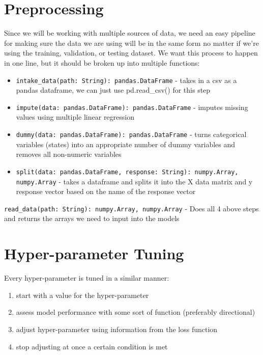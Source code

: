 \documentclass{article}
\begin{document}
	\section{Preprocessing}
	Since we will be working with multiple sources of data, we need an easy pipeline for making sure the data we are using 
	will be in the same form no matter if we're using the training, validation, or testing dataset. We want this process to 
	happen in one line, but it should be broken up into multiple functions: 
	
	\begin{itemize}
		\item \verb|intake_data(path: String): pandas.DataFrame| - takes in a csv as a pandas dataframe, we can just use pd.read\_csv() for this step
		\item \verb|impute(data: pandas.DataFrame): pandas.DataFrame| - imputes missing values using multiple linear regression 
		\item \verb|dummy(data: pandas.DataFrame): pandas.DataFrame| - turns categorical variables (states) into an appropriate number of dummy variables 
		and removes all non-numeric variables 
		\item \verb|split(data: pandas.DataFrame, response: String): numpy.Array, numpy.Array| - takes a dataframe and splits it into the X data matrix and
		y response vector based on the name of the response vector 
	\end{itemize}
	
	\verb|read_data(path: String): numpy.Array, numpy.Array| - Does all 4 above steps and returns the arrays we need to input into the models
	
	\section{Hyper-parameter Tuning}
	
	Every hyper-parameter is tuned in a similar manner: 
	\begin{enumerate}
		\item start with a value for the hyper-parameter 
		\item assess model performance with some sort of function (preferably directional)
		\item adjust hyper-parameter using information from the loss function 
		\item stop adjusting at once a certain condition is met
	
	\end{enumerate}
	
\end{document}
